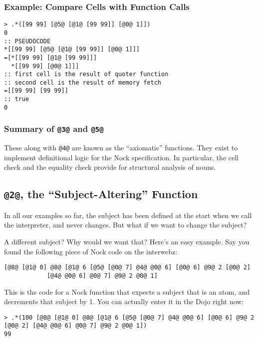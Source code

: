 \documentclass[twoside]{article}
\begin{document}
\subsubsection{Example:  Compare Cells with Function Calls}

\begin{lstlisting}[style=listingcode]
> .*([99 99] [@5@ [@1@ [99 99]] [@0@ 1]])
0
:: PSEUDOCODE
*[[99 99] [@5@ [@1@ [99 99]] [@0@ 1]]]
=[*[[99 99] [@1@ [99 99]]]
  *[[99 99] [@0@ 1]]]
:: first cell is the result of quoter function
:: second cell is the result of memory fetch
=[[99 99] [99 99]]
:: true
0
\end{lstlisting}

\subsubsection{Summary of \lstinline[style=inlinecode]{@3@} and \lstinline[style=inlinecode]{@5@}}

These along with \lstinline[style=inlinecode]{@4@} are known as the “axiomatic” functions.  They exist to implement definitional logic for the Nock specification.  In particular, the cell check and the equality check provide for structural analysis of nouns.

\subsection{\lstinline[style=inlinecode]{@2@}, the “Subject-Altering” Function}
\label{sxn:nock2}

In all our examples so far, the subject has been defined at the start when we call the interpreter, and never changes. But what if we want to change the subject?

A different subject? Why would we want that? Here's an easy example. Say you found the following piece of Nock code on the interwebz:

\begin{lstlisting}[style=listingblock]
[@8@ [@1@ 0] @8@ [@1@ 6 [@5@ [@0@ 7] @4@ @0@ 6] [@0@ 6] @9@ 2 [@0@ 2]
            [@4@ @0@ 6] @0@ 7] @9@ 2 @0@ 1]
\end{lstlisting}

This is the code for a Nock function that expects a subject that is an atom, and decrements that subject by 1. You can actually enter it in the Dojo right now:

\begin{lstlisting}[style=listingblock]
> .*(100 [@8@ [@1@ 0] @8@ [@1@ 6 [@5@ [@0@ 7] @4@ @0@ 6] [@0@ 6] @9@ 2 [@0@ 2] [@4@ @0@ 6] @0@ 7] @9@ 2 @0@ 1])
99
\end{lstlisting}
\end{document}
